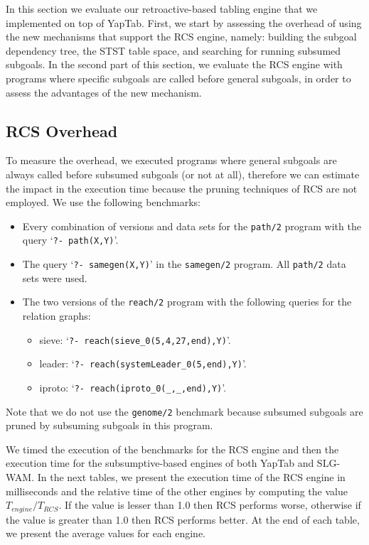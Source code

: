 In this section we evaluate our retroactive-based tabling engine that we implemented on
top of YapTab. First, we start by assessing the overhead of using the new mechanisms that
support the RCS engine, namely: building the subgoal dependency tree, the STST table space,
and searching for running subsumed subgoals. In the second part of this section, we evaluate
the RCS engine with programs where specific subgoals are called before general subgoals, in
order to assess the advantages of the new mechanism.

\subsection{RCS Overhead}

To measure the overhead, we executed programs where general subgoals are always called before
subsumed subgoals (or not at all), therefore we can estimate the impact in the execution time
because the pruning techniques of RCS are not employed.
We use the following benchmarks:

\begin{itemize}
   \item Every combination of versions and data sets for the \texttt{path/2} program with the query `\texttt{?-~path(X,Y)}'.
   
   \item The query `\texttt{?-~samegen(X,Y)}' in the \texttt{samegen/2} program. All \texttt{path/2} data
   sets were used.
   
   \item The two versions of the \texttt{reach/2} program with the following queries for the relation graphs:

   \begin{itemize}
      \item sieve: `\texttt{?-~reach(sieve\_0(5,4,27,end),Y)}'.
      \item leader: `\texttt{?-~reach(systemLeader\_0(5,end),Y)}'.
      \item iproto: `\texttt{?-~reach(iproto\_0(\_,\_,end),Y)}'.
   \end{itemize}
\end{itemize}

Note that we do not use the \texttt{genome/2} benchmark because subsumed subgoals are
pruned by subsuming subgoals in this program.

We timed the execution of the benchmarks for the RCS engine and then the execution time
for the subsumptive-based engines of both YapTab and SLG-WAM. In the next tables,
we present the execution time of the RCS engine in milliseconds and the relative time
of the other engines by computing the value $T_{engine} / T_{RCS}$.
If the value is lesser than 1.0 then RCS performs worse, otherwise if the value is greater than
1.0 then RCS performs better. At the end of each table, we present the average values for
each engine.

